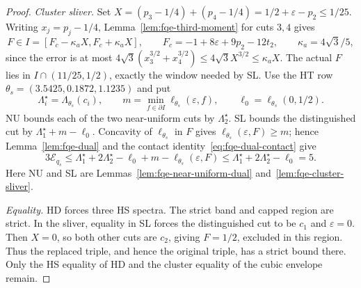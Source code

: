 \begin{proof}
\emph{Cluster sliver.} Set $X=(p_3-1/4)+(p_4-1/4)=1/2+\varepsilon-p_2\le1/25$.
Writing $x_j=p_j-1/4$, Lemma~\ref{lem:fqe-third-moment} for cuts $3,4$ gives
\[
 F\in I=[F_c-\kappa_aX,F_c+\kappa_aX],\qquad
 F_c=-1+8\varepsilon+9p_2-12t_2,\qquad \kappa_a=4\sqrt3/5,
\]
since the error is at most
$4\sqrt3(x_3^{3/2}+x_4^{3/2})\le4\sqrt3X^{3/2}\le\kappa_aX$.
The actual $F$ lies in $I\cap(11/25,1/2)$, exactly the window needed by SL.
Use the HT row $\theta_s=(3.5425,0.1872,1.1235)$ and put
\[
 \Lambda^\star_i=\Lambda_{\theta_s}(c_i),\qquad
 m=\min_{f\in\partial I}\ell_{\theta_s}(\varepsilon,f),\qquad
 \ell_0=\ell_{\theta_s}(0,1/2).
\]
NU bounds each of the two near-uniform cuts by $\Lambda^\star_2$.
SL bounds the distinguished cut by $\Lambda^\star_1+m-\ell_0$.
Concavity of $\ell_{\theta_s}$ in $F$ gives $\ell_{\theta_s}(\varepsilon,F)\ge m$; hence Lemma~\ref{lem:fqe-dual}
and the contact identity~\eqref{eq:fqe-dual-contact} give
\[
 3\mathcal E_{q_s}
 \le \Lambda^\star_1+2\Lambda^\star_2-\ell_0+m-\ell_{\theta_s}(\varepsilon,F)
 \le \Lambda^\star_1+2\Lambda^\star_2-\ell_0=5.
\]
Here NU and SL are Lemmas~\ref{lem:fqe-near-uniform-dual}
and~\ref{lem:fqe-cluster-sliver}.

\emph{Equality.} HD forces three HS spectra. The strict band and capped region are strict.
In the sliver, equality in SL forces the distinguished cut to be $c_1$ and $\varepsilon=0$.
Then $X=0$, so both other cuts are $c_2$, giving $F=1/2$, excluded in this region.
Thus the replaced triple, and hence the original triple, has a strict bound there.
Only the HS equality of HD and the cluster equality of the cubic envelope remain.
\end{proof}





